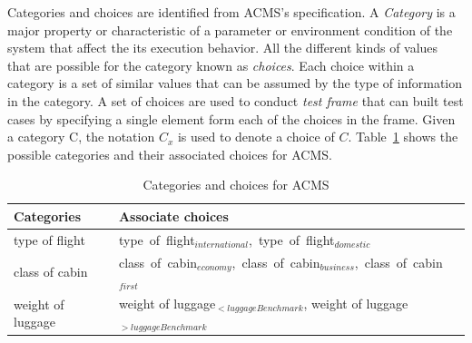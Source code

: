 \documentclass[10pt,journal,compsoc]{IEEEtran}
\begin{document}
Categories and choices are identified from ACMS's specification. A \emph{Category} is a major property or characteristic of a parameter or environment condition of the system that affect the its execution behavior. All the different kinds of values that are possible for the category known as \emph{choices}. Each choice within a category is a set of similar values that can be assumed by the type of information in the category. A set of choices are used to conduct \emph{test frame} that can built test cases by specifying a single element form each of the choices in the frame. Given a category C, the notation $C_x$ is used to denote a choice of $C$. Table~\ref{table:categoryAndchoice} shows the possible categories and their associated choices for ACMS.
\begin{table}
  \caption{Categories and choices for ACMS}
  \label{table:categoryAndchoice}
  \centering
  \begin{tabular}{ll}
  \toprule
  Categories                   &Associate choices \\
  \midrule
  type of flight               &type~of~flight$_{international}$,~type~of~flight$_{domestic}$ \\
  class of cabin               &class~of~cabin$_{economy}$,~class~of~cabin$_{business}$,~class~of~cabin$_{first}$ \\
  weight of luggage            &weight of luggage$_{< luggageBenchmark}$, weight of luggage$_{> luggageBenchmark}$ \\
  \bottomrule
  \end{tabular}
\end{table}
\end{document}
